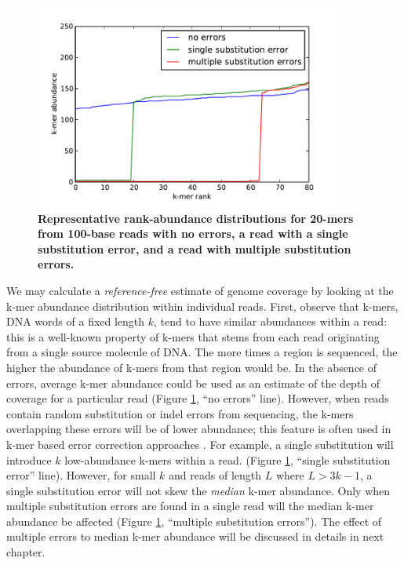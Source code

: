 \begin{figure}[!ht]
\centerline{\includegraphics[width=4in]{diginorm-ranks.pdf}} \caption{ {\bf
Representative rank-abundance distributions for 20-mers from 100-base reads
with no errors, a read with a single substitution error, and a read with
multiple substitution errors.}} \label{fig:rankabund} \end{figure}

We may calculate a {\em reference-free} estimate of genome coverage by looking
at the k-mer abundance distribution within individual reads. First, observe
that k-mers, DNA words of a fixed length $k$, tend to have similar abundances
within a read: this is a well-known property of k-mers that stems from each
read originating from a single source molecule of DNA.  The more times a region
is sequenced, the higher the abundance of k-mers from that region would be.  In
the absence of errors, average k-mer abundance could be used as an estimate of
the depth of coverage for a particular read (Figure \ref{fig:rankabund}, ``no
errors'' line).  However, when reads contain random substitution or indel
errors from sequencing, the k-mers overlapping these errors will be of lower
abundance; this feature is often used in k-mer based error correction
approaches \cite{pubmed21114842}.  For example, a single substitution will
introduce $k$ low-abundance k-mers within a read.  (Figure \ref{fig:rankabund},
``single substitution error'' line).  However, for small $k$ and reads of
length $L$ where $L > 3k-1$, a single substitution error will not skew the {\em
median} k-mer abundance.  Only when multiple substitution errors are found in a
single read will the median k-mer abundance be affected (Figure
\ref{fig:rankabund}, ``multiple substitution errors''). The effect of multiple
errors to median k-mer abundance will be discussed in details in next chapter.


